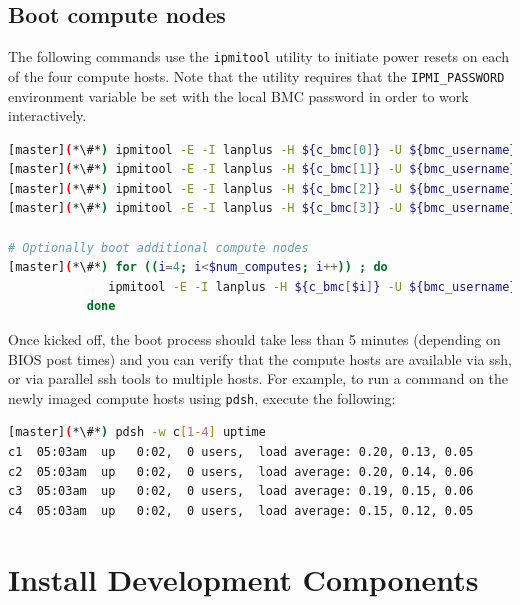 \documentclass[letterpaper]{article}
\begin{document}


\subsection{Boot compute nodes} \label{sec:boot_computes}

 
The following commands use the \texttt{ipmitool} utility to initiate power
resets on each of the four compute hosts. Note that the utility requires that
the \texttt{IPMI\_PASSWORD} environment variable be set with the local BMC password in
order to work interactively.

\begin{lstlisting}[language=bash,keywords={},upquote=true]
[master](*\#*) ipmitool -E -I lanplus -H ${c_bmc[0]} -U ${bmc_username} chassis power reset   # power cycle c1
[master](*\#*) ipmitool -E -I lanplus -H ${c_bmc[1]} -U ${bmc_username} chassis power reset   # power cycle c2
[master](*\#*) ipmitool -E -I lanplus -H ${c_bmc[2]} -U ${bmc_username} chassis power reset   # power cycle c3
[master](*\#*) ipmitool -E -I lanplus -H ${c_bmc[3]} -U ${bmc_username} chassis power reset   # power cycle c4

# Optionally boot additional compute nodes
[master](*\#*) for ((i=4; i<$num_computes; i++)) ; do
              ipmitool -E -I lanplus -H ${c_bmc[$i]} -U ${bmc_username} chassis power reset
           done
\end{lstlisting} 

Once kicked off, the boot process should take less than 5 minutes (depending on
BIOS post times) and you can verify that the compute hosts are available via
ssh, or via parallel ssh tools to multiple hosts. For example, to run a command
on the newly imaged compute hosts using \texttt{pdsh}, execute the following:

\begin{lstlisting}[language=bash]
[master](*\#*) pdsh -w c[1-4] uptime
c1  05:03am  up   0:02,  0 users,  load average: 0.20, 0.13, 0.05
c2  05:03am  up   0:02,  0 users,  load average: 0.20, 0.14, 0.06
c3  05:03am  up   0:02,  0 users,  load average: 0.19, 0.15, 0.06
c4  05:03am  up   0:02,  0 users,  load average: 0.15, 0.12, 0.05
\end{lstlisting}

\section{Install \OHPC{} Development Components}
\end{document}
